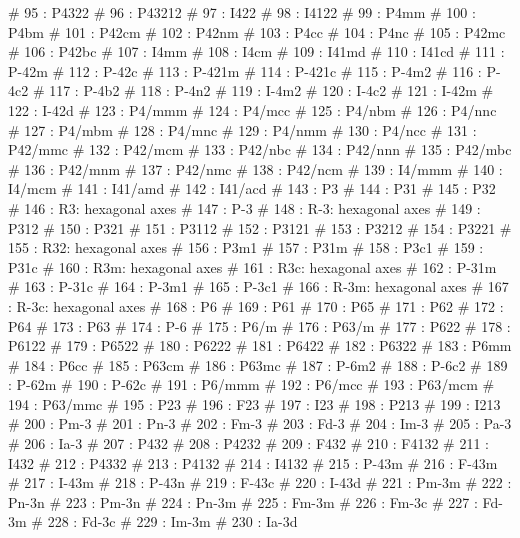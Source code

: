 \begin{MacVerbatim}
#  95 : P4322       #  96 : P43212      #  97 : I422        #  98 : I4122
#  99 : P4mm        # 100 : P4bm        # 101 : P42cm       # 102 : P42nm
# 103 : P4cc        # 104 : P4nc        # 105 : P42mc       # 106 : P42bc
# 107 : I4mm        # 108 : I4cm        # 109 : I41md       # 110 : I41cd
# 111 : P-42m       # 112 : P-42c       # 113 : P-421m      # 114 : P-421c
# 115 : P-4m2       # 116 : P-4c2       # 117 : P-4b2       # 118 : P-4n2
# 119 : I-4m2       # 120 : I-4c2       # 121 : I-42m       # 122 : I-42d
# 123 : P4/mmm      # 124 : P4/mcc      # 125 : P4/nbm      # 126 : P4/nnc
# 127 : P4/mbm      # 128 : P4/mnc      # 129 : P4/nmm      # 130 : P4/ncc
# 131 : P42/mmc     # 132 : P42/mcm     # 133 : P42/nbc     # 134 : P42/nnn
# 135 : P42/mbc     # 136 : P42/mnm     # 137 : P42/nmc     # 138 : P42/ncm
# 139 : I4/mmm      # 140 : I4/mcm      # 141 : I41/amd     # 142 : I41/acd
# 143 : P3
# 144 : P31                             # 145 : P32
# 146 : R3: hexagonal axes              # 147 : P-3
# 148 : R-3: hexagonal axes             # 149 : P312
# 150 : P321                            # 151 : P3112
# 152 : P3121                           # 153 : P3212
# 154 : P3221                           # 155 : R32: hexagonal axes
# 156 : P3m1                            # 157 : P31m
# 158 : P3c1                            # 159 : P31c
# 160 : R3m: hexagonal axes             # 161 : R3c: hexagonal axes
# 162 : P-31m                           # 163 : P-31c
# 164 : P-3m1                           # 165 : P-3c1
# 166 : R-3m: hexagonal axes            # 167 : R-3c: hexagonal axes
# 168 : P6          # 169 : P61         # 170 : P65         # 171 : P62
# 172 : P64         # 173 : P63         # 174 : P-6         # 175 : P6/m
# 176 : P63/m       # 177 : P622        # 178 : P6122       # 179 : P6522
# 180 : P6222       # 181 : P6422       # 182 : P6322       # 183 : P6mm
# 184 : P6cc        # 185 : P63cm       # 186 : P63mc       # 187 : P-6m2
# 188 : P-6c2       # 189 : P-62m       # 190 : P-62c       # 191 : P6/mmm
# 192 : P6/mcc      # 193 : P63/mcm     # 194 : P63/mmc
# 195 : P23         # 196 : F23         # 197 : I23         # 198 : P213
# 199 : I213        # 200 : Pm-3        # 201 : Pn-3        # 202 : Fm-3
# 203 : Fd-3        # 204 : Im-3        # 205 : Pa-3        # 206 : Ia-3
# 207 : P432        # 208 : P4232       # 209 : F432        # 210 : F4132
# 211 : I432        # 212 : P4332       # 213 : P4132       # 214 : I4132
# 215 : P-43m       # 216 : F-43m       # 217 : I-43m       # 218 : P-43n
# 219 : F-43c       # 220 : I-43d       # 221 : Pm-3m       # 222 : Pn-3n
# 223 : Pm-3n       # 224 : Pn-3m       # 225 : Fm-3m       # 226 : Fm-3c
# 227 : Fd-3m       # 228 : Fd-3c       # 229 : Im-3m       # 230 : Ia-3d
\end{MacVerbatim}
